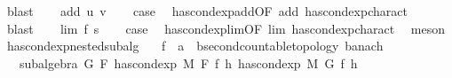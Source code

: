 \begin{isabellebody}
\ blast\isanewline
{}\isamarkupfalse%
\isanewline
\ \ \isamarkupfalse%
\ {\isacharparenleft}{\kern0pt}add\ u\ v{\isacharparenright}{\kern0pt}\isanewline
\ \ \isamarkupfalse%
\ {\isacharquery}{\kern0pt}case\ \isamarkupfalse%
\ has{\isacharunderscore}{\kern0pt}cond{\isacharunderscore}{\kern0pt}exp{\isacharunderscore}{\kern0pt}add{\isacharbrackleft}{\kern0pt}OF\ add{\isacharparenleft}{\kern0pt}{}{\isacharcomma}{\kern0pt}{}{\isacharparenright}{\kern0pt}{\isacharbrackright}{\kern0pt}\ has{\isacharunderscore}{\kern0pt}cond{\isacharunderscore}{\kern0pt}exp{\isacharunderscore}{\kern0pt}charact{\isacharparenleft}{\kern0pt}{}{\isacharparenright}{\kern0pt}\ \isamarkupfalse%
\ blast\isanewline
{}\isamarkupfalse%
\isanewline
\ \ \isamarkupfalse%
\ {\isacharparenleft}{\kern0pt}lim\ f\ s{\isacharparenright}{\kern0pt}\isanewline
\ \ \isamarkupfalse%
\ {\isacharquery}{\kern0pt}case\ \isamarkupfalse%
\ has{\isacharunderscore}{\kern0pt}cond{\isacharunderscore}{\kern0pt}exp{\isacharunderscore}{\kern0pt}lim{\isacharbrackleft}{\kern0pt}OF\ lim{\isacharparenleft}{\kern0pt}{}{\isacharcomma}{\kern0pt}{}{\isacharcomma}{\kern0pt}{}{\isacharcomma}{\kern0pt}{}{\isacharcomma}{\kern0pt}{}{\isacharparenright}{\kern0pt}{\isacharbrackright}{\kern0pt}\ has{\isacharunderscore}{\kern0pt}cond{\isacharunderscore}{\kern0pt}exp{\isacharunderscore}{\kern0pt}charact{\isacharparenleft}{\kern0pt}{}{\isacharparenright}{\kern0pt}\ \isamarkupfalse%
\ meson\isanewline
{}\isamarkupfalse%
%
\endisatagproof
{\isafoldproof}%
%
\isadelimproof
\isanewline
%
\endisadelimproof
\isanewline
{}\isamarkupfalse%
\ has{\isacharunderscore}{\kern0pt}cond{\isacharunderscore}{\kern0pt}exp{\isacharunderscore}{\kern0pt}nested{\isacharunderscore}{\kern0pt}subalg{\isacharcolon}{\kern0pt}\isanewline
\ \ \ f\ {\isacharcolon}{\kern0pt}{\isacharcolon}{\kern0pt}\ {\isachardoublequoteopen}{\isacharprime}{\kern0pt}a\ {\isasymRightarrow}\ {\isacharprime}{\kern0pt}b{\isacharcolon}{\kern0pt}{\isacharcolon}{\kern0pt}{\isacharbraceleft}{\kern0pt}second{\isacharunderscore}{\kern0pt}countable{\isacharunderscore}{\kern0pt}topology{\isacharcomma}{\kern0pt}\ banach{\isacharbraceright}{\kern0pt}{\isachardoublequoteclose}\isanewline
\ \ \ {\isachardoublequoteopen}subalgebra\ G\ F{\isachardoublequoteclose}\ {\isachardoublequoteopen}has{\isacharunderscore}{\kern0pt}cond{\isacharunderscore}{\kern0pt}exp\ M\ F\ f\ h{\isachardoublequoteclose}\ {\isachardoublequoteopen}has{\isacharunderscore}{\kern0pt}cond{\isacharunderscore}{\kern0pt}exp\ M\ G\ f\ h{\isacharprime}{\kern0pt}{\isachardoublequoteclose}\isanewline

\end{isabellebody}
